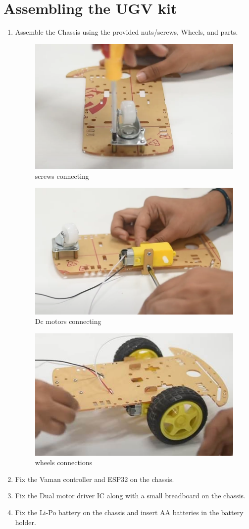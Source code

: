 \section{Assembling the UGV kit}
\begin{enumerate}[label=\thesection.\arabic*.,ref=\thesection.\theenumi]
\item Assemble the Chassis using the provided nuts/screws, Wheels, and parts. 
 
 \begin{figure}[H]
\centering
\includegraphics[width=0.3\columnwidth]{figs/2.png}
\centering
\caption{screws connecting }
\end{figure}
 
 \begin{figure}[H]
\centering
\includegraphics[width=0.3\columnwidth]{figs/3.png}
\caption{Dc motors connecting}
\end{figure}
 \begin{figure}[H]
\centering
\includegraphics[width=0.3\columnwidth]{figs/6.jpg}
\caption{wheels connections }
\end{figure}
 
\item Fix the Vaman controller and ESP32 on the chassis.
\item Fix the Dual motor driver IC along with a small breadboard on the chassis.
\item Fix the Li-Po battery on the chassis and insert AA batteries in the battery holder. 

\end{enumerate}
